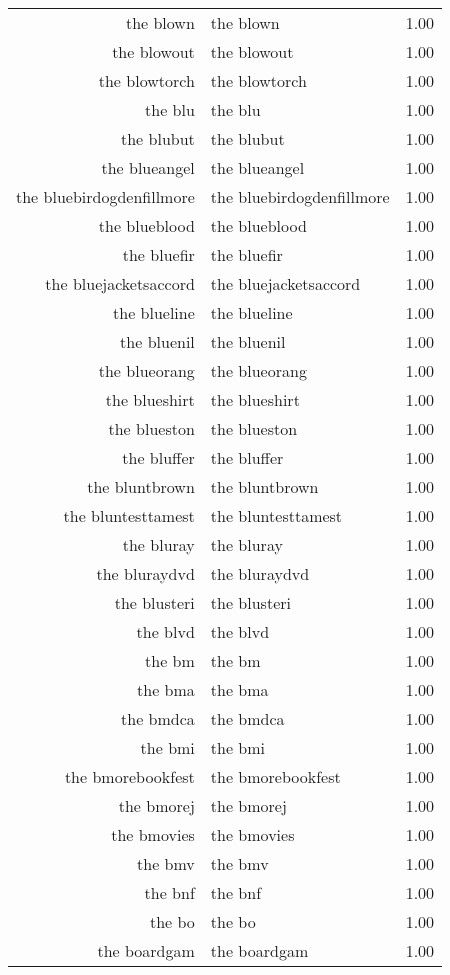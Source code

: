 \begin{table}[ht]
\begin{tabular}{rlr}
  the blown & the blown & 1.00 \\ 
  the blowout & the blowout & 1.00 \\ 
  the blowtorch & the blowtorch & 1.00 \\ 
  the blu & the blu & 1.00 \\ 
  the blubut & the blubut & 1.00 \\ 
  the blueangel & the blueangel & 1.00 \\ 
  the bluebirdogdenfillmore & the bluebirdogdenfillmore & 1.00 \\ 
  the blueblood & the blueblood & 1.00 \\ 
  the bluefir & the bluefir & 1.00 \\ 
  the bluejacketsaccord & the bluejacketsaccord & 1.00 \\ 
  the blueline & the blueline & 1.00 \\ 
  the bluenil & the bluenil & 1.00 \\ 
  the blueorang & the blueorang & 1.00 \\ 
  the blueshirt & the blueshirt & 1.00 \\ 
  the blueston & the blueston & 1.00 \\ 
  the bluffer & the bluffer & 1.00 \\ 
  the bluntbrown & the bluntbrown & 1.00 \\ 
  the bluntesttamest & the bluntesttamest & 1.00 \\ 
  the bluray & the bluray & 1.00 \\ 
  the bluraydvd & the bluraydvd & 1.00 \\ 
  the blusteri & the blusteri & 1.00 \\ 
  the blvd & the blvd & 1.00 \\ 
  the bm & the bm & 1.00 \\ 
  the bma & the bma & 1.00 \\ 
  the bmdca & the bmdca & 1.00 \\ 
  the bmi & the bmi & 1.00 \\ 
  the bmorebookfest & the bmorebookfest & 1.00 \\ 
  the bmorej & the bmorej & 1.00 \\ 
  the bmovies & the bmovies & 1.00 \\ 
  the bmv & the bmv & 1.00 \\ 
  the bnf & the bnf & 1.00 \\ 
  the bo & the bo & 1.00 \\ 
  the boardgam & the boardgam & 1.00 \\ 

\end{tabular}
\end{table}
